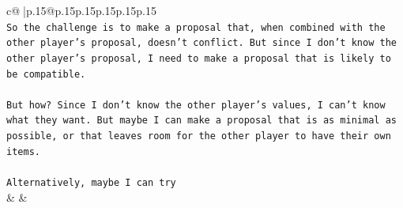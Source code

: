 \documentclass{article}
\begin{document}
{\begin{supertabular}{c@{$\;$}|p{.15\linewidth}@{}p{.15\linewidth}p{.15\linewidth}p{.15\linewidth}p{.15\linewidth}p{.15\linewidth}}
{{{\\ 
\texttt{So the challenge is to make a proposal that, when combined with the other player's proposal, doesn't conflict. But since I don't know the other player's proposal, I need to make a proposal that is likely to be compatible.} \\
\\ 
\texttt{But how? Since I don't know the other player's values, I can't know what they want. But maybe I can make a proposal that is as minimal as possible, or that leaves room for the other player to have their own items.} \\
\\ 
\texttt{Alternatively, maybe I can try} \\
            }
        }
    }
    & & \\ \\


\end{supertabular}}
\end{document}
